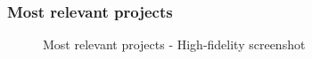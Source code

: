 \documentclass[11pt, letterpaper]{article}
\begin{document}
\subsubsection*{Most relevant projects}
\begin{figure}[H]
    \centering
    \setlength{\fboxsep}{0pt}
    \caption{Most relevant projects - High-fidelity screenshot}
    \label{fig:PageScreenshot_Most_relevant_projects}
\end{figure}
\end{document}
